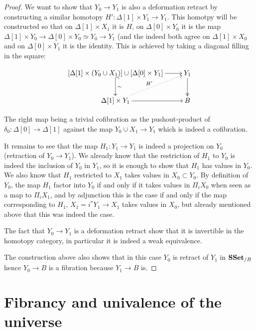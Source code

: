 \documentclass[reqno,10pt,a4paper,oneside,draft]{amsart}
\begin{document}
\begin{proof}
We want to show that $Y_0 \rightarrow Y_1$ is also a deformation retract by constructing a similar homotopy $H':\Delta[1] \times Y_1 \rightarrow Y_1$. This homotpy will be constructed so that on $\Delta[1] \times X_1$ it is $H$, on $\Delta[0] \times Y_0 $ it is the map $\Delta[1] \times Y_0 \rightarrow \Delta[0] \times Y_0 \simeq Y_0 \rightarrow Y_1$ (and the indeed both agree on $\Delta[1] \times X_0$ and on $\Delta[0] \times Y_1$ it is the identity. This is achieved by taking a diagonal filling in the square:


\[\xymatrix{
\left[ \Delta[1] \times (Y_0 \cup X_1) \right] \cup \left[ \Delta[0] \times Y_1 \right] \ar@{^{(}->}[d]^{\sim} \ar[r] & Y_1 \ar@{->>}[d] \\
\Delta[1] \times Y_1 \ar[r] \ar@{.>}[ur]^{H'} & B
}\]

The right map being a trivial cofibration as the pushout-product of $\delta_0 : \Delta[0] \rightarrow \Delta[1]$ against the map $Y_0 \cup X_1 \rightarrow Y_1$ which is indeed a cofibration.

It remains to see that the map $H_{1}:Y_1 \rightarrow Y_1$ is indeed a projection on $Y_0$ (retraction of $Y_0 \rightarrow Y_1$). We already know that the restriction of $H_{1}$ to $Y_0$ is indeed the inclusion of $Y_0$ in $Y_1$, so it is enough to show that $H_{1}$ has values in $Y_0$. We also know that $H_{1}$ restricted to $X_1$ takes values in $X_0 \subset Y_0$. By definition of $Y_0$, the map $H_1$ factor into $Y_0$ if and only if it takes values in $\Pi_i X_0$ when seen as a map to $\Pi_i X_1$, and by adjunction this is the case if and only if the map corresponding to $H_1$, $X_1=i^* Y_1 \rightarrow X_1$ takes values in $X_0$, but already mentioned above that this was indeed the case.

The fact that $Y_0 \rightarrow Y_1$ is a deformation retract show that it is invertible in the homotopy category, in particular it is indeed a weak equivalence.

The construction above also shows that in this case $Y_0$ is retract of $Y_1$ in $\mathbf{SSet}_{/B}$ hence $Y_0 \rightarrow B$ is a fibration because $Y_1 \rightarrow B$ is.

\end{proof}

\newpage

\section{Fibrancy and univalence of the universe}
\label{sec:fibuu}
\end{document}
